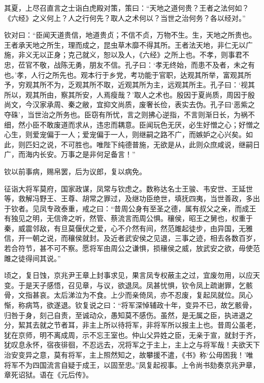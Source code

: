 \documentclass[12pt,UTF8]{ctexbook}
\begin{document}
其夏，上尽召直言之士诣白虎殿对策，策曰：“天地之道何贵？王者之法何如？《六经》之义何上？人之行何先？取人之术何以？当世之治何务？各以经对。”



钦对曰：“臣闻天道贵信，地道贵贞；不信不贞，万物不生。生，天地之所贵也。王者承天地之所生，理而成之，昆虫草木靡不得其所。王者法天地，非仁无以广施，非义无以正身；克己就义，恕以及人，《六经》之所上也。不孝，则事君不忠，莅官不敬，战陈无勇，朋友不信。孔子曰：‘孝无终始，而患不及者，未之有也。’孝，人行之所先也。观本行于乡党，考功能于官职，达观其所举，富观其所予，穷观其所不为，乏观其所不取，近观其所为主，远观其所主。孔子曰：‘视其所以，观其所由，察其所安，人焉瘦哉？’取人之术也。殷因于夏尚质，周因于殷尚文，今汉家承周、秦之敝，宜抑文尚质，废奢长俭，表实去伪。孔子曰‘恶紫之夺硃’，当世治之所务也。臣窃有所忧，言之则拂心逆指，不言则渐日长，为祸不细，然小臣不敢废道而求从，违忠而耦意。臣闻玩色无厌，必生好憎之心；好憎之心生，则爱宠偏于一人；爱宠偏于一人，则继嗣之路不广，而嫉妒之心兴矣。如此，则匹妇之说，不可胜也。唯陛下纯德普施，无欲是从，此则众庶咸说，继嗣日广，而海内长安。万事之是非何足备言！”



钦以前事病，赐帛罢，后为议郎，复以病免。



征诣大将军莫府，国家政谋，凤常与钦虑之。数称达名士王骏、韦安世、王延世等，救解冯野王、王尊、胡常之罪过，及继功臣绝世，填抚四夷，当世善政，多出于钦者。见凤专政泰重，戒之曰：“昔周公身有至圣之德，属有叔父之亲，而成王有独见之明，无信谗之听，然管、蔡流言而周公惧。穰侯，昭王之舅也，权重于秦，威震邻敌，有旦莫偃伏之爱，心不介然有间，然范雎起徒步，由异国，无雅信，开一朝之说，而穰侯就封。及近者武安侯之见退，三事之迹，相去各数百岁，若合符节，甚不可不察。愿将军由周公之谦惧，损穰侯之威，放武安之欲，毋使范雎之徒得间其说。”



顷之，复日蚀，京兆尹王章上封事求见，果言凤专权蔽主之过，宜废勿用，以应天变。于是天子感悟，召见章，与议，欲退凤。凤甚忧惧，钦令凤上疏谢罪，乞骸骨，文指甚哀。太后涕泣为不食。上少而亲倚凤，亦不忍废，复起凤就位。凤心惭，称病笃，欲遂退。钦复说之曰：“将军深悼辅政十年，变异不已，故乞骸骨，归咎于身，刻己自责，至诚动众，愚知莫不感伤。虽然，是无属之臣，执进退之分，絜其去就之节者耳，非主上所以待将军，非将军所以报主上也。昔周公虽老，犹在京师，明不离成周，示不忘王室也。仲山父异姓之臣，无亲于宣，就封于齐，犹叹息永怀，宿夜徘徊，不忍远去，况将军之于主上，主上之与将军哉！夫欲天下治安变异之意，莫有将军，主上照然知之，故攀援不遣，《书》称‘公毋困我！’唯将军不为四国流言自疑于成王，以固至忠。”凤复起视事。上令尚书劾奏京兆尹章，章死诏狱。语在《元后传》。
\end{document}
